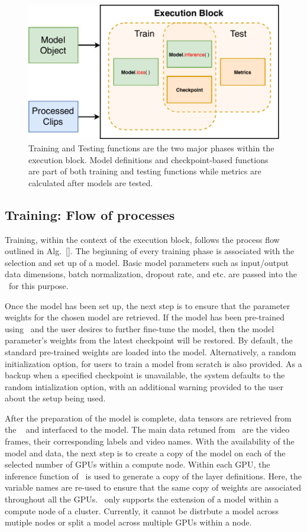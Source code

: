 \documentclass{llncs}
\begin{document}
\begin{figure}[t!]
\centering
\includegraphics[width=0.8\columnwidth]{images/exec_block.pdf}
\caption{Training and Testing functions are the two major phases within the execution block. Model definitions and checkpoint-based functions are part of both training and testing functions while metrics are calculated after models are tested.}
\label{fig:exec_block}
\end{figure}

\subsection{Training: Flow of processes}
\label{sec:training}
Training, within the context of the execution block, follows the process flow outlined in Alg.~\ref{}.
The beginning of every training phase is associated with the selection and set up of a model.
Basic model parameters such as input/output data dimensions, batch normalization, dropout rate, and etc. are passed into the \model~for this purpose.

Once the model has been set up, the next step is to ensure that the parameter weights for the chosen model are retrieved.
If the model has been pre-trained using \acro~and the user desires to further fine-tune the model, then the model parameter's weights from the latest checkpoint will be restored.
By default, the standard pre-trained weights are loaded into the model.
Alternatively, a random initialization option, for users to train a model from scratch is also provided.
As a backup when a specified checkpoint is unavailable, the system defaults to the random intialization option, with an additional warning provided to the user about the setup being used.

After the preparation of the model is complete, data tensors are retrieved from the \data~ and interfaced to the model.
The main data retuned from \data~are the video frames, their corresponding labels and video names.
With the availability of the model and data, the next step is to create a copy of the model on each of the selected number of GPUs within a compute node.
Within each GPU, the inference function of \model~is used to generate a copy of the layer definitions.
Here, the variable names are re-used to ensure that the same copy of weights are associated throughout all the GPUs.
\acro~only supports the extension of a model within a compute node of a cluster.
Currently, it cannot be distrbute a model across mutiple nodes or split a model across multiple GPUs within a node.
\end{document}
